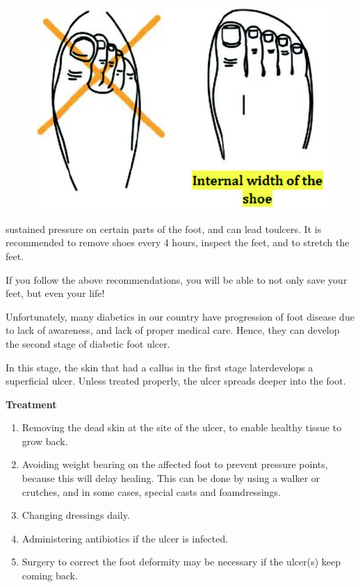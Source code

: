 \begin{enumerate}[a.]
\begin{figure}[h]
\centering
\includegraphics[scale=1.2]{images/066.jpg}
\end{figure}
\vspace{-\topsep}
sustained pressure on certain parts of the foot, and can lead to\break ulcers. It is recommended to remove shoes every 4 hours, inspect the feet, and to stretch the feet.
\end{enumerate}
\vspace{-\topsep}

If you follow the above recommendations, you will be able to not only save your feet, but even your life!


Unfortunately, many diabetics in our country have progression of foot disease due to lack of awareness, and lack of proper medical care. Hence, they can develop the second stage of diabetic foot ulcer.

In this stage, the skin that had a callus in the first stage later\break develops a superficial ulcer. Unless treated properly, the ulcer spreads deeper into the foot.

\noindent\textbf{Treatment}

\vspace{-\topsep}
\begin{enumerate}[•]
\itemsep=0pt
\item Removing the dead skin at the site of the ulcer, to enable healthy tissue to grow back.
\item Avoiding weight bearing on the affected foot to prevent pressure points, because this will delay healing. This can be done by using a walker or crutches, and in some cases, special casts and foam\break dressings.
\item Changing dressings daily.
\item Administering antibiotics if the ulcer is infected.
\item Surgery to correct the foot deformity may be necessary if the ulcer(s) keep coming back.
\end{enumerate}

